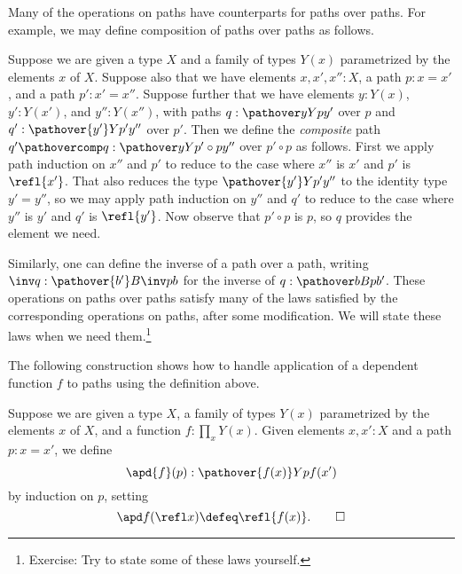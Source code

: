 Many of the operations on paths have counterparts for paths over paths.
For example, we may define composition of paths over paths as follows.

\begin{definition}\label{def:pathovercomposition}
  Suppose we are given a type $X$ and a family of types $Y(x)$ parametrized by the elements $x$ of $X$.
  Suppose also that we have elements $x, x', x'' : X$, a path $p : x = x'$, and a path $p' : x' = x''$.
  Suppose further that we have elements $y : Y(x)$, $y' : Y(x')$, and $y'' : Y(x'')$, with paths $q : \pathover y Y p {y'}$ over $p$
  and $q' : \pathover {y'} Y {p'} {y''}$ over $p'$.
  Then we define the \emph{composite} path $q' \pathovercomp q : \pathover y Y {p' \circ p} {y''}$ over $p' \circ p$ as follows.
  First we apply path induction on $x''$ and $p'$ to reduce to the case where $x''$ is $x'$ and $p'$ is $\refl{x'}$.
  That also reduces the type $\pathover {y'} Y {p'} {y''}$ to the identity type $y' = y''$, so we may apply path induction on $y''$ and $q'$ to reduce
  to the case where $y''$ is $y'$ and $q'$ is $\refl{y'}$.
  Now observe that $p' \circ p$ is $p$, so $q$ provides the element we need.
\end{definition}

Similarly, one can define the inverse of a path over a path,
writing $\inv q : \pathover {b'} B {\inv p} b$ for the inverse
of $q : \pathover b B p {b'}$.
These operations on paths over paths
satisfy many of the laws satisfied by the corresponding operations on paths,
after some modification.
We will state these laws when we need them.\footnote{%
  Exercise: Try to state some of these laws yourself.}

The following construction shows how to handle application of a dependent
function $f$ to paths using the definition above.

\begin{definition}\label{def:apd}
  Suppose we are given a type $X$, a family of types $Y(x)$ parametrized by the elements $x$ of $X$, and a function $f:\prod_x Y(x)$.
  Given elements $x,x':X$ and a path $p : x = x'$, we define
  \[
    \apd{f}(p) : \pathover {f(x)} Y p {f(x')}
  \]
  by induction on $p$, setting
  \[
    \apd f {(\refl x)} \defeq \refl {f(x)}.\qedhere
  \]
\end{definition}

